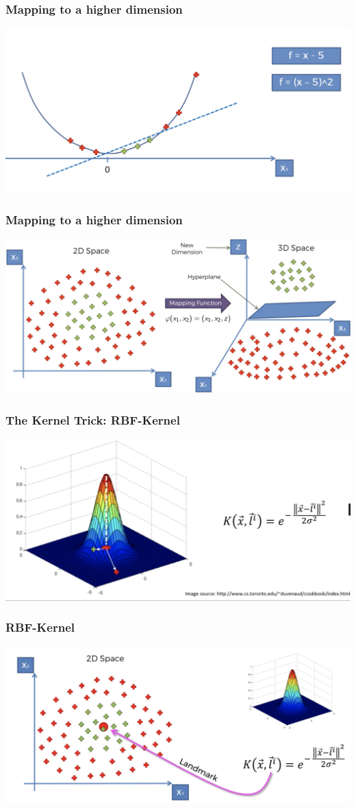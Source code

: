 \documentclass[compress, aspectratio=54]{beamer}
\begin{document}
\begin{frame}
\frametitle{Mapping to a higher dimension}
\includegraphics[width=0.85\linewidth ]{Figures/svm-f5.png}


\end{frame}
\begin{frame}
\frametitle{Mapping to a higher dimension}
\includegraphics[width=0.85\linewidth ]{Figures/svm-f6.png}


\end{frame}

\begin{frame}
\frametitle{The Kernel Trick: RBF-Kernel}
\includegraphics[width=0.85\linewidth ]{Figures/svm-rbf.png}


\end{frame}

\begin{frame}
\frametitle{RBF-Kernel}
\includegraphics[width=0.85\linewidth ]{Figures/svm-rbf2.png}

\end{frame}
\end{document}
